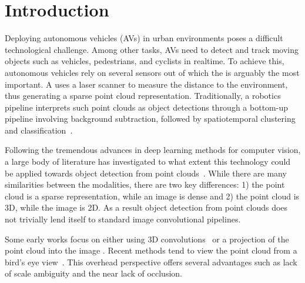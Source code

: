 \documentclass[10pt,twocolumn,letterpaper]{article}
\newcommand{\squeeze}{\vspace{-0.5mm}}
\begin{document}
\squeeze
\section{Introduction} \label{sec:intro}
\squeeze

Deploying autonomous vehicles (AVs) in urban environments poses a difficult technological challenge.
Among other tasks, AVs need to detect and track moving objects such as vehicles, pedestrians, and cyclists in realtime.
To achieve this, autonomous vehicles rely on several sensors out of which the \lidar is arguably the most important.
A \lidar uses a laser scanner to measure the distance to the environment, thus generating a sparse point cloud representation.
Traditionally, a \lidar robotics pipeline interprets such point clouds as object detections through a bottom-up pipeline involving background subtraction, followed by spatiotemporal clustering and classification~\cite{classic_lidar,himmelsbach2008lidar}.

Following the tremendous advances in deep learning methods for computer vision,
a large body of literature has investigated to what extent this technology could be applied towards object detection from \lidar point clouds~\cite{voxelnet,hdnet,pixor,avod,mv3d,frustum,contfuse,second,complexyolo,roarnet}.
While there are many similarities between the modalities, there are two key differences:
1) the point cloud is a sparse representation, while an image is dense and
2) the point cloud is 3D, while the image is 2D.
As a result object detection from point clouds does not trivially lend itself to standard image convolutional pipelines.

Some early works focus on either using 3D convolutions~\cite{engelcke2017vote3deep} or a projection of the point cloud into the image \cite{fcl}.
Recent methods tend to view the \lidar point cloud from a bird's eye view~\cite{mv3d, avod, voxelnet, pixor}.
This overhead perspective offers several advantages such as lack of scale ambiguity and the near lack of occlusion.
\end{document}
